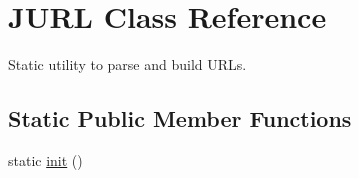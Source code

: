 \hypertarget{classJURL}{\section{J\-U\-R\-L Class Reference}
\label{classJURL}
}


Static utility to parse and build U\-R\-Ls.  


\subsection*{Static Public Member Functions}
\begin{DoxyCompactItemize}
\item 
\hypertarget{classJURL_aff846d42ceb57c64f3595e9998509c4a}{static \hyperlink{classJURL_aff846d42ceb57c64f3595e9998509c4a}{init} ()}\label{classJURL_aff846d42ceb57c64f3595e9998509c4a}


\end{DoxyCompactItemize}

